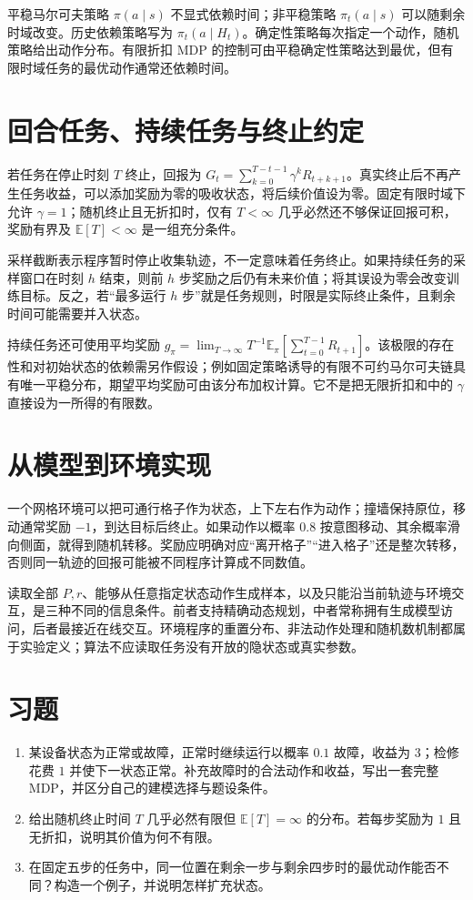 平稳马尔可夫策略 $\pi(a\mid s)$ 不显式依赖时间；非平稳策略 $\pi_t(a\mid s)$ 可以随剩余时域改变。历史依赖策略写为 $\pi_t(a\mid H_t)$。确定性策略每次指定一个动作，随机策略给出动作分布。有限折扣 MDP 的控制可由平稳确定性策略达到最优，但有限时域任务的最优动作通常还依赖时间。

\section{回合任务、持续任务与终止约定}

若任务在停止时刻 $T$ 终止，回报为 $G_t=\sum_{k=0}^{T-t-1}\gamma^kR_{t+k+1}$。真实终止后不再产生任务收益，可以添加奖励为零的吸收状态，将后续价值设为零。固定有限时域下允许 $\gamma=1$；随机终止且无折扣时，仅有 $T<\infty$ 几乎必然还不够保证回报可积，奖励有界及 $\mathbb E[T]<\infty$ 是一组充分条件。

采样截断表示程序暂时停止收集轨迹，不一定意味着任务终止。如果持续任务的采样窗口在时刻 $h$ 结束，则前 $h$ 步奖励之后仍有未来价值；将其误设为零会改变训练目标。反之，若“最多运行 $h$ 步”就是任务规则，时限是实际终止条件，且剩余时间可能需要并入状态。

持续任务还可使用平均奖励 $g_\pi=\lim_{T\to\infty}T^{-1}\mathbb E_\pi[\sum_{t=0}^{T-1}R_{t+1}]$。该极限的存在性和对初始状态的依赖需另作假设；例如固定策略诱导的有限不可约马尔可夫链具有唯一平稳分布，期望平均奖励可由该分布加权计算。它不是把无限折扣和中的 $\gamma$ 直接设为一所得的有限数。

\section{从模型到环境实现}

一个网格环境可以把可通行格子作为状态，上下左右作为动作；撞墙保持原位，移动通常奖励 $-1$，到达目标后终止。如果动作以概率 $0.8$ 按意图移动、其余概率滑向侧面，就得到随机转移。奖励应明确对应“离开格子”“进入格子”还是整次转移，否则同一轨迹的回报可能被不同程序计算成不同数值。

读取全部 $P,r$、能够从任意指定状态动作生成样本，以及只能沿当前轨迹与环境交互，是三种不同的信息条件。前者支持精确动态规划，中者常称拥有生成模型访问，后者最接近在线交互。环境程序的重置分布、非法动作处理和随机数机制都属于实验定义；算法不应读取任务没有开放的隐状态或真实参数。

\section{习题}
\begin{enumerate}
\item 某设备状态为正常或故障，正常时继续运行以概率 $0.1$ 故障，收益为 $3$；检修花费 $1$ 并使下一状态正常。补充故障时的合法动作和收益，写出一套完整 MDP，并区分自己的建模选择与题设条件。
\item 给出随机终止时间 $T$ 几乎必然有限但 $\mathbb E[T]=\infty$ 的分布。若每步奖励为 $1$ 且无折扣，说明其价值为何不有限。
\item 在固定五步的任务中，同一位置在剩余一步与剩余四步时的最优动作能否不同？构造一个例子，并说明怎样扩充状态。
\end{enumerate}





